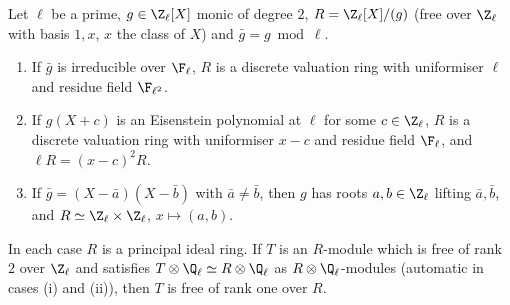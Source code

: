 \begin{lemma}\label{lem:ant:quadraticZl}
Let $\ell$ be a prime, $g\in\Z_\ell[X]$ monic of degree $2$, $R=\Z_\ell[X]/(g)$ (free over $\Z_\ell$ with basis $1,x$, $x$ the class of $X$) and $\bar g=g\bmod\ell$.
\begin{enumerate}[label=(\roman*)]
\item If $\bar g$ is irreducible over $\F_\ell$, $R$ is a discrete valuation ring with uniformiser $\ell$ and residue field $\F_{\ell^2}$.
\item If $g(X+c)$ is an Eisenstein polynomial at $\ell$ for some $c\in\Z_\ell$, $R$ is a discrete valuation ring with uniformiser $x-c$ and residue field
$\F_\ell$, and $\ell R=(x-c)^2R$.
\item If $\bar g=(X-\bar a)(X-\bar b)$ with $\bar a\ne\bar b$, then $g$ has roots $a,b\in\Z_\ell$ lifting $\bar a,\bar b$, and $R\simeq\Z_\ell\times\Z_\ell$, $x\mapsto(a,b)$.
\end{enumerate}
In each case $R$ is a principal ideal ring. If $T$ is an $R$-module which is free of rank $2$ over $\Z_\ell$ and satisfies $T\otimes\Q_\ell\simeq R\otimes\Q_\ell$ as
$R\otimes\Q_\ell$-modules (automatic in cases (i) and (ii)), then $T$ is free of rank one over $R$.
\end{lemma}

